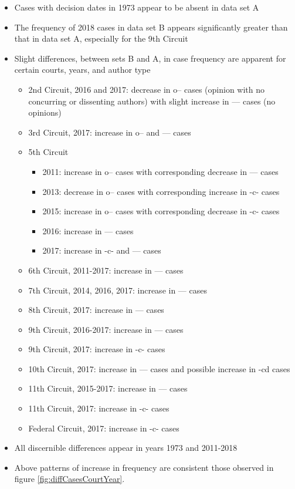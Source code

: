 \documentclass[10pt, letterpaper]{article}
\begin{document}
\begin{spacing}{1.0}
\begin{itemize}\setlength\itemsep{1pt}
    \item Cases with decision dates in 1973 appear to be absent in data set A
    \item The frequency of 2018 cases in data set B appears significantly greater than that in data set A, especially for the 9th Circuit
    \item Slight differences, between sets B and A, in case frequency are apparent for certain courts, years, and author type
    \begin{itemize}[noitemsep]
      \item 2nd Circuit, 2016 and 2017:  decrease in o-- cases (opinion with no concurring or dissenting authors) with slight increase in --- cases (no opinions)
      \item 3rd Circuit, 2017:  increase in o-- and --- cases
      \item 5th Circuit
      \begin{itemize}[noitemsep]
        \item 2011:  increase in o-- cases with corresponding decrease in --- cases
        \item 2013:  decrease in o-- cases with corresponding increase in -c- cases
        \item 2015:  increase in o-- cases with corresponding decrease in -c- cases
        \item 2016:  increase in --- cases
        \item 2017:  increase in -c- and --- cases
      \end{itemize}
      \item 6th Circuit, 2011-2017:  increase in --- cases
      \item 7th Circuit, 2014, 2016, 2017:  increase in --- cases
      \item 8th Circuit, 2017:  increase in --- cases
      \item 9th Circuit, 2016-2017:  increase in --- cases
      \item 9th Circuit, 2017:  increase in -c- cases
      \item 10th Circuit, 2017:  increase in --- cases and possible increase in -cd cases
      \item 11th Circuit, 2015-2017:  increase in --- cases
      \item 11th Circuit, 2017:  increase in -c- cases
      \item Federal Circuit, 2017:  increase in -c- cases
    \end{itemize}
    \item All discernible differences appear in years 1973 and 2011-2018
    \item Above patterns of increase in frequency are consistent those observed in figure \ref{fig:diffCasesCourtYear}.
\end{itemize}


\end{spacing}
\end{document}
